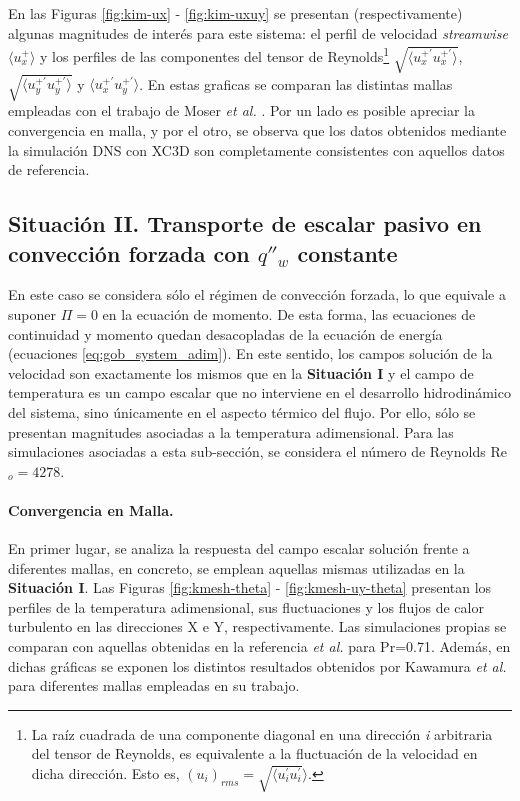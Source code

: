 En las Figuras \ref{fig:kim-ux} - \ref{fig:kim-uxuy} se presentan (respectivamente) algunas magnitudes de interés para este sistema: el perfil de velocidad \textit{streamwise} $\langle u^+_x \rangle$ y los perfiles de las componentes del tensor de Reynolds\footnote{La raíz cuadrada de una componente diagonal en una dirección \textit{i} arbitraria del tensor de Reynolds, es equivalente a la fluctuación de la velocidad en dicha dirección. Esto es, $(u_i)_{rms} = \sqrt{ \langle u^{\prime}_i u^{\prime}_i} \rangle $.} $\sqrt{\langle u^{+ \prime}_x u^{+ \prime}_x \rangle}$, $\sqrt{\langle u^{+ \prime}_y u^{+ \prime}_y \rangle}$ y $\langle u^{+ \prime}_x u^{+ \prime}_y \rangle$. En estas graficas se comparan las distintas mallas empleadas con el trabajo de Moser \textit{et al.} \cite{moser1999}. Por un lado es posible apreciar la convergencia en malla, y por el otro, se observa que los datos obtenidos mediante la simulación DNS con XC3D son completamente consistentes con aquellos datos de referencia.

\subsection{Situación II. Transporte de escalar pasivo en convección forzada con $q''_w$ constante}

En este caso se considera sólo el régimen de convección forzada, lo que equivale a suponer $\Pi=0$ en la ecuación de momento. De esta forma, las ecuaciones de continuidad y momento quedan desacopladas de la ecuación de energía (ecuaciones \ref{eq:gob_system_adim}). En este sentido, los campos solución de la velocidad son exactamente los mismos que en la \textbf{Situación I} y el campo de temperatura es un campo escalar que no interviene en el desarrollo hidrodinámico del sistema, sino únicamente en el aspecto térmico del flujo. Por ello, sólo se presentan magnitudes asociadas a la temperatura adimensional. Para las simulaciones asociadas a esta sub-sección, se considera el número de Reynolds Re$_o=4278$. 

\paragraph{Convergencia en Malla.}
En primer lugar, se analiza la respuesta del campo escalar solución frente a diferentes mallas, en concreto, se emplean aquellas mismas utilizadas en la \textbf{Situación I}.  Las Figuras \ref{fig:kmesh-theta} - \ref{fig:kmesh-uy-theta} presentan los perfiles de la temperatura adimensional, sus fluctuaciones y los flujos de calor turbulento en las direcciones X e Y, respectivamente. Las simulaciones propias se comparan con aquellas obtenidas en la referencia \textit{et al.} \cite{kawamura2000dns} para Pr=0.71. Además, en dichas gráficas se exponen los distintos resultados obtenidos por Kawamura \textit{et al.} para diferentes mallas empleadas en su trabajo. 

